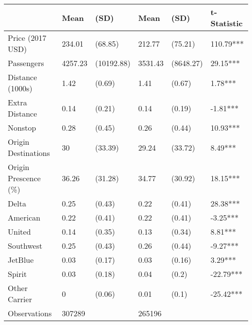
\begin{tabular}[t]{llllll}
\toprule
 & Mean & (SD) & Mean & (SD) & t-Statistic\\
\midrule
Price (2017 USD) & 234.01 & (68.85) & 212.77 & (75.21) & 110.79***\\
Passengers & 4257.23 & (10192.88) & 3531.43 & (8648.27) & 29.15***\\
Distance (1000s) & 1.42 & (0.69) & 1.41 & (0.67) & 1.78***\\
Extra Distance & 0.14 & (0.21) & 0.14 & (0.19) & -1.81***\\
Nonstop & 0.28 & (0.45) & 0.26 & (0.44) & 10.93***\\
\addlinespace
Origin Destinations & 30 & (33.39) & 29.24 & (33.72) & 8.49***\\
Origin Prescence (\%) & 36.26 & (31.28) & 34.77 & (30.92) & 18.15***\\
Delta & 0.25 & (0.43) & 0.22 & (0.41) & 28.38***\\
American & 0.22 & (0.41) & 0.22 & (0.41) & -3.25***\\
United & 0.14 & (0.35) & 0.13 & (0.34) & 8.81***\\
\addlinespace
Southwest & 0.25 & (0.43) & 0.26 & (0.44) & -9.27***\\
JetBlue & 0.03 & (0.17) & 0.03 & (0.16) & 3.29***\\
Spirit & 0.03 & (0.18) & 0.04 & (0.2) & -22.79***\\
Other Carrier & 0 & (0.06) & 0.01 & (0.1) & -25.42***\\
Observations & 307289 &  & 265196 &  & \\
\bottomrule
\end{tabular}
